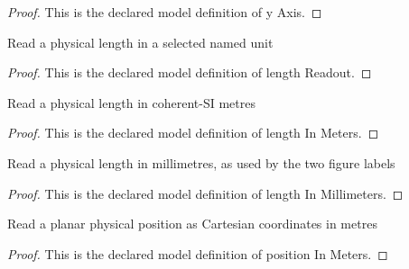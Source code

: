 \begin{proof}
  This is the declared model definition of y Axis.
\end{proof}
\begin{definition}
  \label{def:physics:phyx-mini-0853:phyxminiproblems-problemphyxmini0853-lengthreadout}
  Read a physical length in a selected named unit
\end{definition}
\begin{proof}
  This is the declared model definition of length Readout.
\end{proof}
\begin{definition}
  \label{def:physics:phyx-mini-0853:phyxminiproblems-problemphyxmini0853-lengthinmeters}
  Read a physical length in coherent-SI metres
\end{definition}
\begin{proof}
  This is the declared model definition of length In Meters.
\end{proof}
\begin{definition}
  \label{def:physics:phyx-mini-0853:phyxminiproblems-problemphyxmini0853-lengthinmillimeters}
  Read a physical length in millimetres, as used by the two figure labels
\end{definition}
\begin{proof}
  This is the declared model definition of length In Millimeters.
\end{proof}
\begin{definition}
  \label{def:physics:phyx-mini-0853:phyxminiproblems-problemphyxmini0853-positioninmeters}
  Read a planar physical position as Cartesian coordinates in metres
\end{definition}
\begin{proof}
  This is the declared model definition of position In Meters.
\end{proof}
